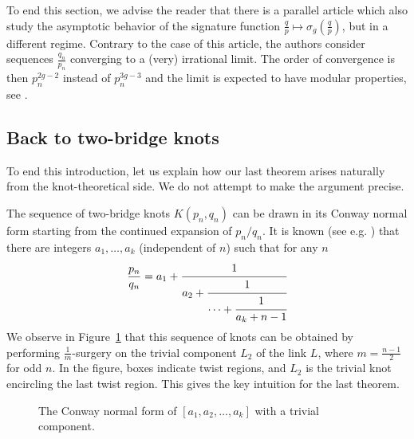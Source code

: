 \documentclass{amsart}
\theoremstyle{definition}
\begin{document}
To end this section, we advise the reader that there is a parallel article which also study the asymptotic behavior of the signature function $\frac{q}{p}\mapsto \sigma_g(\frac{q}{p})$, but in a different regime. Contrary to the case of this article, the authors consider sequences $\frac{q_n}{p_n}$ converging to a (very) irrational limit. The order of convergence is then $p_n^{2g-2}$ instead of $p_n^{3g-3}$ and the limit is expected to have modular properties, see \cite{MarMas}.

\subsection{Back to two-bridge knots}
To end this introduction, let us explain how our last theorem arises naturally from the knot-theoretical side. We do not attempt to make the argument precise. 

The sequence of two-bridge knots $K(p_n,q_n)$ can be drawn in its Conway normal form starting from the continued expansion of $p_n/q_n$. It is known (see e.g. \cite{Khi}) that there are integers $a_1,\ldots,a_k$ (independent of $n$) such that for any $n$
$$\frac{p_n}{q_n}=a_1+\cfrac{1}{a_2+\cfrac{1}{\cdots+\cfrac{1}{a_k+n-1}}}$$
We observe in Figure~\ref{fig.planardiagram} that this sequence of knots can be obtained by performing $\frac{1}{m}$-surgery on the trivial component $L_2$ of the link $L$, where $m=\frac{n-1}{2}$ for odd $n$. In the figure, boxes indicate twist regions, and $L_2$ is the trivial knot encircling the last twist region. This gives the key intuition for the last theorem. 

\begin{figure}[htpb!]
    \centering
    
    \caption{The Conway normal form of $[a_1,a_2,\ldots,a_k]$ with a trivial component.}
    \label{fig.planardiagram}
\end{figure}
\end{document}
